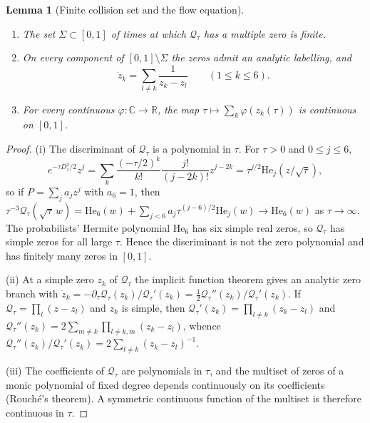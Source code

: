 \documentclass[11pt]{article}
\newtheorem{lemma}[theorem]{Lemma}
\theoremstyle{definition}
\theoremstyle{remark}
\begin{document}
\begin{lemma}[Finite collision set and the flow equation]
\label{lem:f2v51-flow}
\begin{enumerate}[label=\textup{(\roman*)}]
\item The set \(\Sigma\subset[0,1]\) of times at which
\(\mathcal Q_\tau\) has a multiple zero is finite.
\item On every component of \([0,1]\setminus\Sigma\) the zeros admit an
analytic labelling, and
\begin{equation}
 \dot z_k=\sum_{l\ne k}\frac1{z_k-z_l}\qquad(1\le k\le6).
 \label{eq:f2v51-ode}
\end{equation}
\item For every continuous \(\varphi:\mathbb C\to\mathbb R\), the map
\(\tau\mapsto\sum_k\varphi(z_k(\tau))\) is continuous on \([0,1]\).
\end{enumerate}
\end{lemma}

\begin{proof}
(i) The discriminant of \(\mathcal Q_\tau\) is a polynomial in \(\tau\).
For \(\tau>0\) and \(0\le j\le6\),
\[
 e^{-\tau D_z^2/2}z^j
 =\sum_{k}\frac{(-\tau/2)^k}{k!}\frac{j!}{(j-2k)!}z^{j-2k}
 =\tau^{j/2}\mathrm{He}_j\!\left(z/\sqrt\tau\right),
\]
so if \(P=\sum_ja_jz^j\) with \(a_6=1\), then
\(\tau^{-3}\mathcal Q_\tau(\sqrt\tau\,w)
 =\mathrm{He}_6(w)+\sum_{j<6}a_j\tau^{(j-6)/2}\mathrm{He}_j(w)\to\mathrm{He}_6(w)\)
as \(\tau\to\infty\).  The probabilists' Hermite polynomial
\(\mathrm{He}_6\) has six simple real zeros, so \(\mathcal Q_\tau\) has
simple zeros for all large \(\tau\).  Hence the discriminant is not the
zero polynomial and has finitely many zeros in \([0,1]\).

(ii) At a simple zero \(z_k\) of \(\mathcal Q_\tau\) the implicit
function theorem gives an analytic zero branch with
\(\dot z_k=-\partial_\tau\mathcal Q_\tau(z_k)/\mathcal Q_\tau'(z_k)
 =\tfrac12\mathcal Q_\tau''(z_k)/\mathcal Q_\tau'(z_k)\).  If
\(\mathcal Q_\tau=\prod_l(z-z_l)\) and \(z_k\) is simple, then
\(\mathcal Q_\tau'(z_k)=\prod_{l\ne k}(z_k-z_l)\) and
\(\mathcal Q_\tau''(z_k)=2\sum_{m\ne k}\prod_{l\ne k,m}(z_k-z_l)\),
whence \(\mathcal Q_\tau''(z_k)/\mathcal Q_\tau'(z_k)
 =2\sum_{l\ne k}(z_k-z_l)^{-1}\).

(iii) The coefficients of \(\mathcal Q_\tau\) are polynomials in
\(\tau\), and the multiset of zeros of a monic polynomial of fixed degree
depends continuously on its coefficients (Rouch\'{e}'s theorem).  A
symmetric continuous function of the multiset is therefore continuous in
\(\tau\).
\end{proof}
\end{document}
